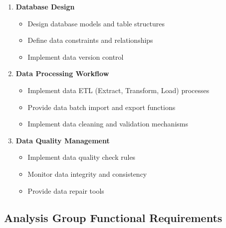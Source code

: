 \documentclass[a4paper,12pt]{article}
\begin{document}
\begin{enumerate}
  \item \textbf{Database Design}
  \begin{itemize}
    \item Design database models and table structures
    \item Define data constraints and relationships
    \item Implement data version control
  \end{itemize}
  
  \item \textbf{Data Processing Workflow}
  \begin{itemize}
    \item Implement data ETL (Extract, Transform, Load) processes
    \item Provide data batch import and export functions
    \item Implement data cleaning and validation mechanisms
  \end{itemize}
  
  \item \textbf{Data Quality Management}
  \begin{itemize}
    \item Implement data quality check rules
    \item Monitor data integrity and consistency
    \item Provide data repair tools
  \end{itemize}
\end{enumerate}

\subsection{Analysis Group Functional Requirements}
\end{document}
